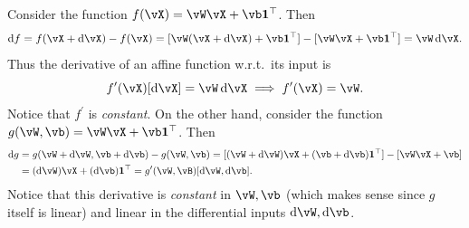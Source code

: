 \documentclass[../../book-main.tex]{subfiles}
\begin{document}
\begin{example}
    Consider the function \(f(\vX) = \vW\vX + \vb\vone^{\top}\). Then 
    \begin{equation}
        \odif{f} = f(\vX + \odif{\vX}) - f(\vX) = [\vW(\vX + \odif{\vX}) + \vb\vone^{\top}] - [\vW \vX + \vb \vone^{\top}] = \vW\odif{\vX}.
    \end{equation}
    Thus the derivative of an affine function w.r.t.~its input is 
    \begin{equation}
        f^{\prime}(\vX)[\odif{\vX}] = \vW\odif{\vX} \implies f^{\prime}(\vX) = \vW.
    \end{equation}
    Notice that \(f^{\prime}\) is \textit{constant}. On the other hand, consider the function \(g(\vW, \vb) = \vW\vX + \vb\vone^{\top}\). Then 
    \begin{align}
        \odif{g} 
        &= g(\vW + \odif{\vW}, \vb + \odif{\vb}) - g(\vW, \vb) = [(\vW + \odif{\vW})\vX + (\vb + \odif{\vb})\vone^{\top}] - [\vW\vX + \vb] \\
        &= (\odif{\vW})\vX + (\odif{\vb})\vone^{\top} = g^{\prime}(\vW, \vB)[\odif{\vW}, \odif{\vb}].
    \end{align}
    Notice that this derivative is \textit{constant} in \(\vW, \vb\) (which makes sense since \(g\) itself is linear) and linear in the differential inputs \(\odif{\vW}, \odif{\vb}\).
\end{example}
\end{document}
